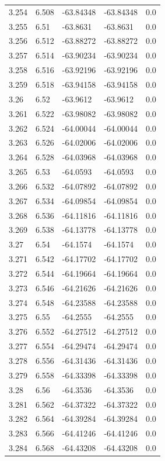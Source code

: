 \begin{tabular}{lllll}
3.254 & 6.508 & -63.84348 & -63.84348 & 0.0 \\
3.255 & 6.51 & -63.8631 & -63.8631 & 0.0 \\
3.256 & 6.512 & -63.88272 & -63.88272 & 0.0 \\
3.257 & 6.514 & -63.90234 & -63.90234 & 0.0 \\
3.258 & 6.516 & -63.92196 & -63.92196 & 0.0 \\
3.259 & 6.518 & -63.94158 & -63.94158 & 0.0 \\
3.26 & 6.52 & -63.9612 & -63.9612 & 0.0 \\
3.261 & 6.522 & -63.98082 & -63.98082 & 0.0 \\
3.262 & 6.524 & -64.00044 & -64.00044 & 0.0 \\
3.263 & 6.526 & -64.02006 & -64.02006 & 0.0 \\
3.264 & 6.528 & -64.03968 & -64.03968 & 0.0 \\
3.265 & 6.53 & -64.0593 & -64.0593 & 0.0 \\
3.266 & 6.532 & -64.07892 & -64.07892 & 0.0 \\
3.267 & 6.534 & -64.09854 & -64.09854 & 0.0 \\
3.268 & 6.536 & -64.11816 & -64.11816 & 0.0 \\
3.269 & 6.538 & -64.13778 & -64.13778 & 0.0 \\
3.27 & 6.54 & -64.1574 & -64.1574 & 0.0 \\
3.271 & 6.542 & -64.17702 & -64.17702 & 0.0 \\
3.272 & 6.544 & -64.19664 & -64.19664 & 0.0 \\
3.273 & 6.546 & -64.21626 & -64.21626 & 0.0 \\
3.274 & 6.548 & -64.23588 & -64.23588 & 0.0 \\
3.275 & 6.55 & -64.2555 & -64.2555 & 0.0 \\
3.276 & 6.552 & -64.27512 & -64.27512 & 0.0 \\
3.277 & 6.554 & -64.29474 & -64.29474 & 0.0 \\
3.278 & 6.556 & -64.31436 & -64.31436 & 0.0 \\
3.279 & 6.558 & -64.33398 & -64.33398 & 0.0 \\
3.28 & 6.56 & -64.3536 & -64.3536 & 0.0 \\
3.281 & 6.562 & -64.37322 & -64.37322 & 0.0 \\
3.282 & 6.564 & -64.39284 & -64.39284 & 0.0 \\
3.283 & 6.566 & -64.41246 & -64.41246 & 0.0 \\
3.284 & 6.568 & -64.43208 & -64.43208 & 0.0 \\

\end{tabular}
